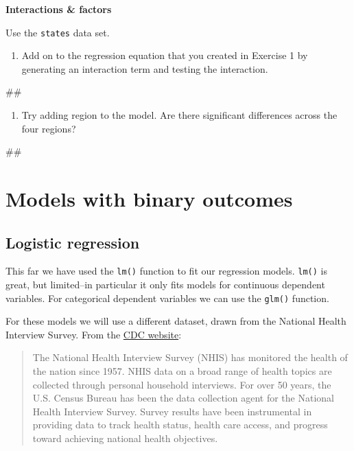 \documentclass[]{book}
\newenvironment{Shaded}{\begin{snugshade}}{\end{snugshade}}
\newcommand{\NormalTok}[1]{#1}
\providecommand{\tightlist}{%
  \setlength{\itemsep}{0pt}\setlength{\parskip}{0pt}}
\begin{document}
\textbf{Interactions \& factors}

Use the \texttt{states} data set.

\begin{enumerate}
\def\labelenumi{\arabic{enumi}.}
\tightlist
\item
  Add on to the regression equation that you created in Exercise 1 by
  generating an interaction term and testing the interaction.
\end{enumerate}

\begin{Shaded}
\begin{Highlighting}[]
\NormalTok{## }
\end{Highlighting}
\end{Shaded}

\begin{enumerate}
\def\labelenumi{\arabic{enumi}.}
\setcounter{enumi}{1}
\tightlist
\item
  Try adding region to the model. Are there significant differences
  across the four regions?
\end{enumerate}

\begin{Shaded}
\begin{Highlighting}[]
\NormalTok{## }
\end{Highlighting}
\end{Shaded}

\section{Models with binary outcomes}\label{models-with-binary-outcomes}

\subsection{Logistic regression}\label{logistic-regression}

This far we have used the \texttt{lm()} function to fit our regression
models. \texttt{lm()} is great, but limited--in particular it only fits
models for continuous dependent variables. For categorical dependent
variables we can use the \texttt{glm()} function.

For these models we will use a different dataset, drawn from the
National Health Interview Survey. From the
\href{http://www.cdc.gov/nchs/nhis.htm}{CDC website}:

\begin{quote}
The National Health Interview Survey (NHIS) has monitored the health of
the nation since 1957. NHIS data on a broad range of health topics are
collected through personal household interviews. For over 50 years, the
U.S. Census Bureau has been the data collection agent for the National
Health Interview Survey. Survey results have been instrumental in
providing data to track health status, health care access, and progress
toward achieving national health objectives.
\end{quote}
\end{document}
